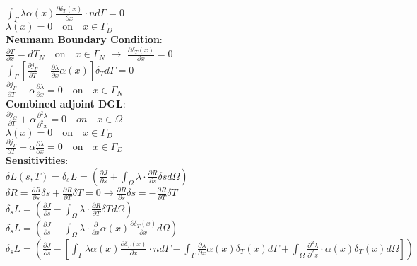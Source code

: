 \documentclass[10pt]{article} %
\begin{document}
\begin{center}
	$\int_\Gamma \lambda \alpha(x) \frac{\partial \delta_T(x)}{\partial x} \cdot n d\Gamma = 0$\\
	$\lambda (x) = 0 \quad \text{on} \quad x\in\Gamma_D$\\
	\textbf{Neumann Boundary Condition}:\\
	$\frac{\partial T}{\partial x} = dT_N \quad \text{on} \quad x\in\Gamma_N$ $\rightarrow$ $\frac{\partial \delta_T(x)}{\partial x} = 0$\\
	$\int_\Gamma \left[ \frac{\partial j_\Gamma}{\partial T} - \frac{\partial \lambda}{\partial x} \alpha(x) \right]\delta_T d\Gamma = 0$\\
	$\frac{\partial j_\Gamma}{\partial T} - \alpha \frac{\partial \lambda}{\partial x} = 0 \quad \text{on} \quad x\in\Gamma_N$\\
	\textbf{Combined adjoint DGL}:\\
	$\frac{\partial j_\Omega}{\partial T} + \alpha \frac{\partial^2 \lambda}{\partial^2 x} = 0 \quad on \quad x \in \Omega$\\
	$\lambda (x) = 0 \quad \text{on} \quad x\in\Gamma_D$\\
	$\frac{\partial j_\Gamma}{\partial T} - \alpha \frac{\partial \lambda}{\partial x} = 0 \quad \text{on} \quad x\in\Gamma_D$\\
	\textbf{Sensitivities}:\\
	$\delta L(s,T) = \delta_s L = \left( \frac{\partial J}{\partial s} + \int_\Omega \lambda \cdot \frac{\partial R}{\partial s}\delta s d\Omega\right)  $\\
	$\delta R = \frac{\partial R}{\partial s}\delta s + \frac{\partial R}{\partial T}\delta T  = 0$\quad$\rightarrow$\quad$\frac{\partial R}{\partial s}\delta s  = - \frac{\partial R}{\partial T}\delta T$\\
	$\delta_s L = \left( \frac{\partial J}{\partial s} - \int_\Omega \lambda \cdot \frac{\partial R}{\partial T}\delta T d\Omega\right)  $\\
	$\delta_s L = \left( \frac{\partial J}{\partial s} - \int_\Omega \lambda \cdot \frac{\partial}{\partial x}\alpha(x) \frac{\partial \delta_T(x)}{\partial x} d\Omega\right)  $\\
	$\delta_s L = \left( \frac{\partial J}{\partial s} - \left[\int_\Gamma \lambda \alpha(x) \frac{\partial \delta_T(x)}{\partial x} \cdot n d\Gamma - \int_\Gamma \frac{\partial \lambda}{\partial x} \alpha(x) \delta_T(x) d\Gamma + \int_\Omega \frac{\partial^2 \lambda}{\partial^2 x} \cdot \alpha(x) \delta_T(x) d\Omega \right] \right)$\\

\end{center}
\end{document}
